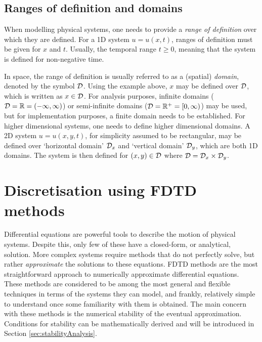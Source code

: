 
\subsection{Ranges of definition and domains}\label{sec:domains}
When modelling physical systems, one needs to provide a \textit{range of definition} over which they are defined. For a 1D system $u = u(x,t)$, ranges of definition must be given for $x$ and $t$. Usually, the temporal range $t\geq 0$, meaning that the system is defined for non-negative time. 

In space, the range of definition is usually referred to as a (spatial) \textit{domain}, denoted by the symbol $\mathcal{D}$. Using the example above, $x$ may be defined over $\mathcal{D}$, which is written as $x\in \mathcal{D}$. For analysis purposes, infinite domains ($\mathcal{D} = \mathbb{R} = (-\infty, \infty)$) or semi-infinite domains ($\mathcal{D} = \mathbb{R}^+ = [0, \infty)$) may be used, but for implementation purposes, a finite domain needs to be established. For higher dimensional systems, one needs to define higher dimensional domains. A 2D system $u=u(x,y,t)$, for simplicity assumed to be rectangular, may be defined over `horizontal domain' $\mathcal{D}_x$ and `vertical domain' $\mathcal{D}_y$, which are both 1D domains. The system is then defined for $(x,y)\in \mathcal{D}$ where $\mathcal{D} = \mathcal{D}_x\times \mathcal{D}_y$. 

\section{Discretisation using FDTD methods}\label{sec:discUsingFDTD}
Differential equations are powerful tools to describe the motion of physical systems. Despite this, only few of these have a closed-form, or analytical, solution. More complex systems require methods that do not perfectly solve, but rather \textit{approximate} the solutions to these equations. FDTD methods are the most straightforward approach to numerically approximate differential equations. These methods are considered to be among the most general and flexible techniques in terms of the systems they can model, and frankly, relatively simple to understand once some familiarity with them is obtained. The main concern with these methods is the numerical stability of the eventual approximation. Conditions for stability can be mathematically derived and will be introduced in Section \ref{sec:stabilityAnalysis}.

